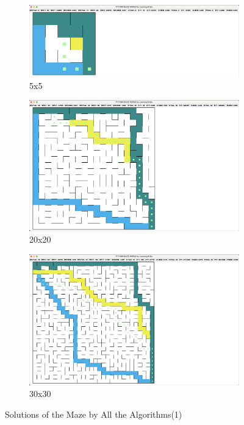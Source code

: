 \documentclass{article}
\begin{document}
\begin{figure}[htp]
    \centering
    \begin{subfigure}[b]{1\textwidth}
        \centering
        \includegraphics[width=\textwidth]{imgs/s_5.eps}
        \caption{5x5}
    \end{subfigure}
    \newline
    \begin{subfigure}[b]{1\textwidth}
        \centering
        \includegraphics[width=\textwidth]{imgs/s_20.eps}
        \caption{20x20}
    \end{subfigure}
    \newline
    \begin{subfigure}[b]{1\textwidth}
        \centering
        \includegraphics[width=\textwidth]{imgs/s_30.eps}
        \caption{30x30}
    \end{subfigure}
    \caption{Solutions of the Maze by All the Algorithms(1)}
\end{figure}
\end{document}
